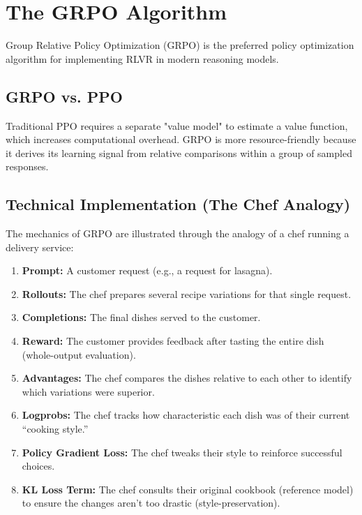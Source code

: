 ﻿\section{The GRPO Algorithm}
\label{sec:limitations}


Group Relative Policy Optimization (GRPO) is the preferred policy optimization algorithm for implementing RLVR in modern reasoning models.

\subsection{GRPO vs. PPO}

Traditional PPO requires a separate "value model" to estimate a value function, which increases computational overhead. GRPO is more resource-friendly because it derives its learning signal from relative comparisons within a group of sampled responses.

\subsection{Technical Implementation (The Chef Analogy)}

The mechanics of GRPO are illustrated through the analogy of a chef running a delivery service:

\begin{enumerate}
    \item \textbf{Prompt:} A customer request (e.g., a request for lasagna).
    \item \textbf{Rollouts:} The chef prepares several recipe variations for that single request.
    \item \textbf{Completions:} The final dishes served to the customer.
    \item \textbf{Reward:} The customer provides feedback after tasting the entire dish (whole-output evaluation).
    \item \textbf{Advantages:} The chef compares the dishes relative to each other to identify which variations were superior.
    \item \textbf{Logprobs:} The chef tracks how characteristic each dish was of their current ``cooking style.''
    \item \textbf{Policy Gradient Loss:} The chef tweaks their style to reinforce successful choices.
    \item \textbf{KL Loss Term:} The chef consults their original cookbook (reference model) to ensure the changes aren't too drastic (style-preservation).
\end{enumerate}


